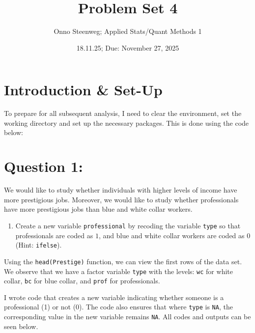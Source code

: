 \documentclass[
]{article}
\title{Problem Set 4}
\date{18.11.25; Due: November 27, 2025}
\author{Onno Steenweg; Applied Stats/Quant Methods 1}
\newenvironment{Shaded}{\begin{snugshade}}{\end{snugshade}}
\newcommand{\AttributeTok}[1]{\textcolor[rgb]{0.13,0.29,0.53}{#1}}
\newcommand{\ConstantTok}[1]{\textcolor[rgb]{0.56,0.35,0.01}{#1}}
\newcommand{\FunctionTok}[1]{\textcolor[rgb]{0.13,0.29,0.53}{\textbf{#1}}}
\newcommand{\NormalTok}[1]{#1}
\newcommand{\SpecialCharTok}[1]{\textcolor[rgb]{0.81,0.36,0.00}{\textbf{#1}}}
\newcommand{\StringTok}[1]{\textcolor[rgb]{0.31,0.60,0.02}{#1}}
\begin{document}
\maketitle

\section*{Introduction \& Set-Up}
To prepare for all subsequent analysis, I need to clear the environment,
set the working directory and set up the necessary packages. This is
done using the code below:

\begin{Shaded}
\end{Shaded}

\section*{Question 1:}
\noindent We would like to study whether individuals with higher levels of income have more prestigious jobs. Moreover, we would like to study whether professionals have more prestigious jobs than blue and white collar workers.

\begin{enumerate}
	\item [(\textbf{a})]
	Create a new variable \texttt{professional} by recoding the variable \texttt{type} so that professionals are coded as $1$, and blue and white collar workers are coded as $0$ (Hint: \texttt{ifelse}).
\end{enumerate}
	
Using the \texttt{head(Prestige)} function, we can view the first rows of the data set. We observe that we have a factor variable \texttt{type} with the levels:
\texttt{wc} for white collar, \texttt{bc} for blue collar, and \texttt{prof} for professionals.

I wrote code that creates a new variable indicating whether someone is a professional (1) or not (0). The code also ensures that where \texttt{type} is \texttt{NA}, the corresponding value in the new variable remains \texttt{NA}. All codes and outputs can be seen below.
\end{document}
